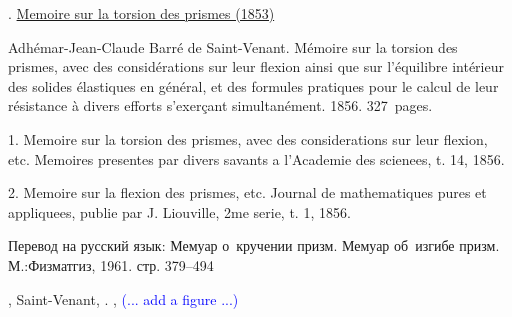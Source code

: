 

\label{para:twistingofrods.saintvenant}

\begin{otherlanguage}{russian}

{\small
{}. \href{https://babel.hathitrust.org/cgi/pt?id=hvd.32044091959866&seq=7}{Memoire sur la torsion des prismes (1853)}

Adhémar-Jean-Claude Barré de Saint\hbox{-\hspace{-0.2ex}}Venant.
Mémoire sur la torsion des prismes, avec des considérations sur leur flexion ainsi que sur l'équilibre intérieur des solides élastiques en général, et des formules pratiques pour le calcul de leur résistance à divers efforts s’exerçant simultanément.
1856.
327~pages.

1. Memoire sur la torsion des prismes, avec des considerations sur leur flexion, etc. Memoires presentes par divers savants a l'Academie des scienees, t. 14, 1856.

2. Memoire sur la flexion des prismes, etc. Journal de mathematiques pures et appliquees, publie par J. Liouville, 2me serie, t. 1, 1856.

Перевод на русский язык:
 Мемуар о~кручении призм. Мемуар об~изгибе призм. М.:\;Физ\-мат\-гиз, 1961.
стр. 379--494
\par}

\end{otherlanguage}

,
Saint\hbox{-\hspace{-0.2ex}}Venant,
.
 
,
\textcolor{blue}{(... add a figure ...)}

